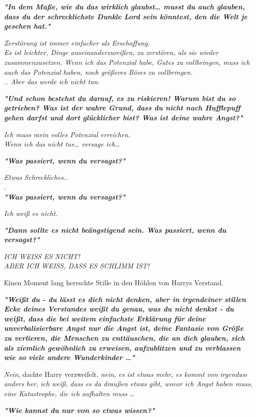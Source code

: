{\textbf{\emph{"In dem Maße, wie du das wirklich glaubst… musst du auch glauben, dass du der schrecklichste Dunkle Lord sein könntest, den die Welt je gesehen hat."}}

\emph{Zerstörung ist immer einfacher als Erschaffung.\\ Es ist leichter, Dinge auseinanderzureißen, zu zerstören, als sie wieder zusammenzusetzen. Wenn ich das Potenzial habe, Gutes zu vollbringen, muss ich auch das Potenzial haben, noch größeres Böses zu vollbringen.\\ .. Aber das werde ich nicht tun.}

\textbf{\emph{"Und schon bestehst du darauf, es zu riskieren! Warum bist du so getrieben? Was ist der wahre Grund, dass du nicht nach Hufflepuff gehen darfst und dort glücklicher bist? Was ist deine wahre Angst?"}}

\emph{Ich muss mein volles Potenzial erreichen.\\ Wenn ich das nicht tue… versage ich…}

\textbf{\emph{"Was passiert, wenn du versagst?"}}

\emph{Etwas Schreckliches..}\\ .\\ \textbf{\emph{"Was passiert, wenn du versagst?"}}

\emph{Ich weiß es nicht.}

\textbf{\emph{"Dann sollte es nicht beängstigend sein. Was passiert, wenn du versagst?"}}

\emph{ICH WEISS ES NICHT!\\ ABER ICH WEISS, DASS ES SCHLIMM IST!}

Einen Moment lang herrschte Stille in den Höhlen von Harrys Verstand.

\textbf{\emph{"Weißt du - du lässt es dich nicht denken, aber in irgendeiner stillen Ecke deines Verstandes weißt du genau, was du nicht denkst - du weißt, dass die bei weitem einfachste Erklärung für deine unverbalisierbare Angst nur die Angst ist, deine Fantasie von Größe zu verlieren, die Menschen zu enttäuschen, die an dich glauben, sich als ziemlich gewöhnlich zu erweisen, aufzublitzen und zu verblassen wie so viele andere Wunderkinder …"}}

\emph{Nein}, dachte Harry verzweifelt, \emph{nein, es ist etwas mehr, es kommt von irgendwo anders her, ich weiß, dass es da draußen etwas gibt, wovor ich Angst haben muss, eine Katastrophe, die ich aufhalten muss …}

\textbf{\emph{"Wie kannst du nur von so etwas wissen?"}}

}
